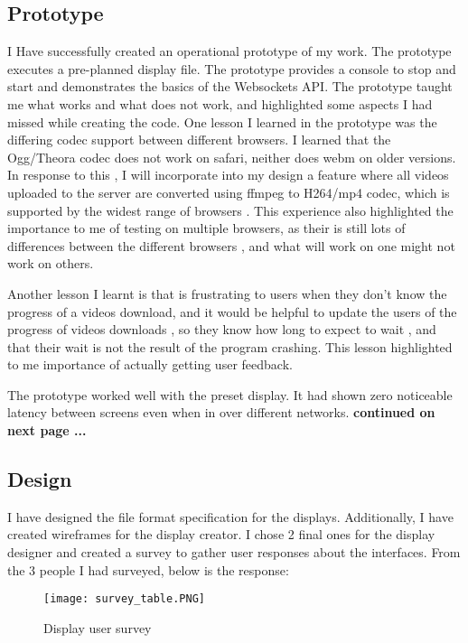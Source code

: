 \documentclass{article}
\begin{document}
\subsection{Prototype}
I Have successfully created an operational prototype of my work. The prototype executes a pre-planned display file. The prototype provides a console to stop and start and demonstrates the basics of the Websockets API. The prototype taught me what works and what does not work, and highlighted some aspects I had missed while creating the code. One lesson I learned in the prototype was the differing codec support between different browsers. I learned that the Ogg/Theora codec does not work on safari, neither does webm on older versions. In response to this , I will incorporate into my design a feature where all videos uploaded to the server are converted using ffmpeg to H264/mp4 codec, which is supported by the widest range of browsers \cite{mozilla}. This experience also highlighted the importance to me  of testing on multiple browsers, as their is still lots of differences between the different browsers , and what will work on one might not work on others.

Another lesson I learnt is that is frustrating to users when they don't know the progress of a videos download, and it would be helpful to update the users of the progress of videos downloads , so they know how long to expect to wait , and that their wait is not the result of the program crashing. This lesson highlighted to me importance of actually getting user feedback.

The prototype worked well with the preset display. It had shown zero noticeable latency between screens even when in over different networks. 
\newline\newline\newline
\textbf{continued on next page ...} 

\pagebreak

\subsection{Design}

I have designed the file format specification for the displays. Additionally, I have created wireframes for the display creator. I chose 2 final ones for the display designer and created a survey to gather user responses about the interfaces. From the 3 people I had surveyed, below is the response:
\begin{figure}[h!]
    \centering
    \texttt{[image: survey\_table.PNG]}
    \caption{Display user survey}
    \label{fig:Table for the results of the survey }
\end{figure}
\end{document}
